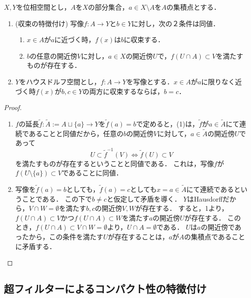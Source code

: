 \documentclass[uplatex,dvipdfmx]{jsreport}
\begin{document}
\begin{proposition}[Hausdorff空間では極限は一意的]\label{prop-uniqueness-of-limit-in-Hausdorff-space}
    $X,Y$を位相空間とし，$A$を$X$の部分集合，$a\in X\setminus A$を$A$の集積点とする．
    \begin{enumerate}
        \item (収束の特徴付け) 写像$f:A\to Y$と$b\in Y$に対し，次の２条件は同値．
        \begin{enumerate}[(1)]
            \item $x\in A$が$a$に近づく時，$f(x)$は$b$に収束する．
            \item $b$の任意の開近傍$V$に対し，$a\in X$の開近傍$U$で，$f(U\cap A)\subset V$を満たすものが存在する．
        \end{enumerate}
        \item $Y$をハウスドルフ空間とし，$f:A\to Y$を写像とする．$x\in A$が$a$に限りなく近づく時$f(x)$が$b,c\in Y$の両方に収束するならば，$b=c$．
    \end{enumerate}
\end{proposition}
\begin{proof}\mbox{}
    \begin{enumerate}
        \item $f$の延長$\widetilde{f}:\widetilde{A}:=A\sqcup\{a\}\to Y$を$\widetilde{f}(a)=b$で定めると，(1)は，$\widetilde{f}$が$a\in\widetilde{A}$にて連続であることと同値だから，任意の$b$の開近傍$V$に対して，$a\in\widetilde{A}$の開近傍$U$であって
        \[U\subset\widetilde{f}^{-1}(V)\Leftrightarrow \widetilde{f}(U)\subset V\]
        を満たすものが存在するということと同値である．
        これは，写像$f$が$f(U\setminus\{a\})\subset V$であることに同値．
        \item 
        写像を$\widetilde{f}(a)=b$としても，$\widetilde{f}(a)=c$としても$x=a\in\widetilde{A}$にて連続であるということである．
        この下で$b\ne c$と仮定して矛盾を導く．
        $Y$はHausdorffだから，$V\cap W=\emptyset$を満たす$b,c$の開近傍$V,W$が存在する．
        すると，1より，$f(U\cap A)\subset V$かつ$f(U\cap A)\subset W$を満たす$a$の開近傍$U$が存在する．
        このとき，$f(U\cap A)\subset V\cap W=\emptyset$より，$U\cap A=\emptyset$である．
        $U$は$a$の開近傍であったから，この条件を満たす$U$が存在することは，$a$が$A$の集積点であることに矛盾する．
    \end{enumerate}
\end{proof}

\subsection{超フィルターによるコンパクト性の特徴付け}
\end{document}
